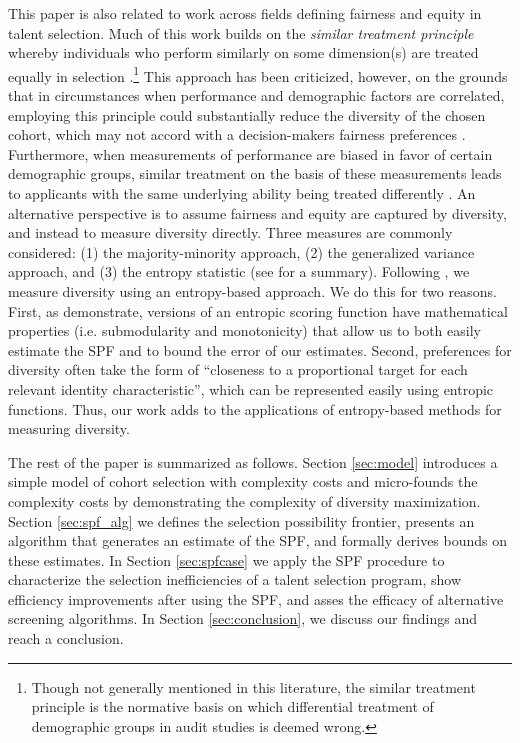 This paper is also related to work across fields defining fairness and equity in talent selection. Much of this work builds on the \emph{similar treatment principle} whereby individuals who perform similarly on some dimension(s) are treated equally in selection \cite{dwork_fairness_2012}.\footnote{Though not generally mentioned in this literature, the similar treatment principle is the normative basis on which differential treatment of demographic groups in audit studies is deemed wrong.} This approach has been criticized, however, on the grounds that in circumstances when performance and demographic factors are correlated, employing this principle could substantially reduce the diversity of the chosen cohort, which may not accord with a decision-makers fairness preferences \cite{fleisher_whats_nodate}. Furthermore, when measurements of performance are biased in favor of certain demographic groups, similar treatment on the basis of these measurements leads to applicants with the same underlying ability being treated differently \cite{fleisher_whats_nodate}. An alternative perspective is to assume fairness and equity are captured by diversity, and instead to measure diversity directly. Three measures are commonly considered: (1) the majority-minority approach, (2) the generalized variance approach, and (3) the entropy statistic (see \textcite{budescu2012measure} for a summary). Following \textcite{huppenkothen2020entrofy}, we measure diversity using an entropy-based approach. We do this for two reasons. First, as \textcite{huppenkothen2020entrofy} demonstrate, versions of an entropic scoring function have mathematical properties (i.e. submodularity and monotonicity) that allow us to both easily estimate the SPF and to bound the error of our estimates. Second, preferences for diversity often take the form of ``closeness to a proportional target for each relevant identity characteristic'', which can be represented easily using entropic functions. Thus, our work adds to the applications of entropy-based methods for measuring diversity.

The rest of the paper is summarized as follows. Section \ref{sec:model} introduces a simple model of cohort selection with complexity costs and micro-founds the complexity costs by demonstrating the complexity of diversity maximization. Section \ref{sec:spf_alg} we defines the selection possibility frontier, presents an algorithm that generates an estimate of the SPF, and formally derives bounds on these estimates. In Section \ref{sec:spfcase} we apply the SPF procedure to characterize the selection inefficiencies of a talent selection program, show efficiency improvements after using the SPF, and asses the efficacy of alternative screening algorithms. In Section \ref{sec:conclusion}, we discuss our findings and reach a conclusion. 


